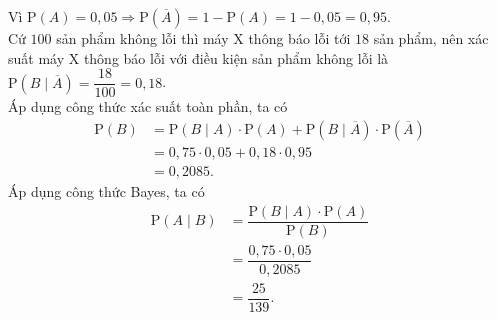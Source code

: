 \begin{ex}
{\begin{itemchoice}
			\itemch Vì $\mathrm{P}\left(A\right) = 0{,}05\Rightarrow \mathrm{P}\left(\overline{A}\right) = 1 - \mathrm{P}\left(A\right) = 1 - 0{,}05 = 0{,}95$.\\
			Cứ $100$ sản phẩm không lỗi thì máy X thông báo lỗi tới $18$ sản phẩm, nên xác suất máy X thông báo lỗi với điều kiện sản phẩm không lỗi là $\mathrm{P}\left(B\mid \overline{A}\right) = \dfrac{18}{100} = 0{,}18$.\\
			Áp dụng công thức xác suất toàn phần, ta có
			\begin{align*}
				\mathrm{P}\left(B\right) &= \mathrm{P}\left(B\mid A\right)\cdot \mathrm{P}\left(A\right) + \mathrm{P}\left(B\mid \overline{A}\right)\cdot \mathrm{P}\left(\overline{A}\right)\\
				&=0{,}75\cdot 0{,}05 + 0{,}18\cdot 0{,}95\\
				&=0{,}2085.
			\end{align*}			
			\itemch Áp dụng công thức Bayes, ta có
			\begin{align*}
				\mathrm{P}\left(A\mid B\right) &= \dfrac{\mathrm{P}\left(B\mid A\right)\cdot \mathrm{P}\left(A\right)}{\mathrm{P}\left(B\right)}\\
				&=\dfrac{0{,}75 \cdot 0{,}05}{0{,}2085}\\
				&=\dfrac{25}{139}.
			\end{align*}
		\end{itemchoice}
	}
\end{ex}

